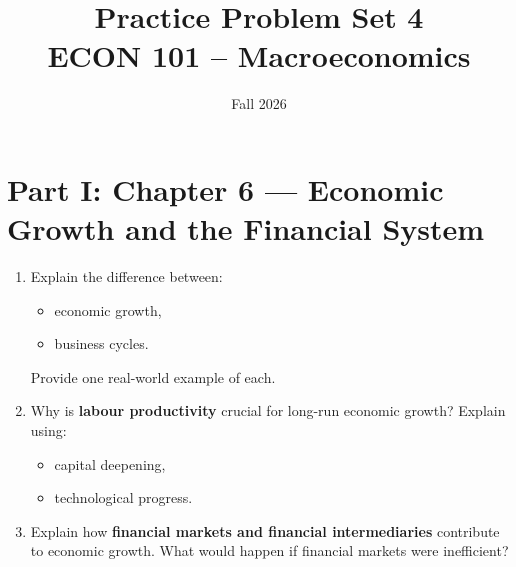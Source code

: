 \documentclass[12pt]{article}
\title{Practice Problem Set 4\\ \vspace{10pt} \large ECON 101 -- Macroeconomics}
\author{}
\date{ \vspace{-30pt} Fall 2026}
\begin{document}
\maketitle

\section*{Part I: Chapter 6 — Economic Growth and the Financial System}


\begin{enumerate}[label=\textbf{\arabic*.}]

\item Explain the difference between:
\begin{itemize}
    \item economic growth,
    \item business cycles.
\end{itemize}
Provide one real-world example of each.

\item Why is \textbf{labour productivity} crucial for long-run economic growth? 
Explain using:
\begin{itemize}
    \item capital deepening,
    \item technological progress.
\end{itemize}

\item Explain how \textbf{financial markets and financial intermediaries} contribute to economic growth. 
What would happen if financial markets were inefficient?

\end{enumerate}
\end{document}
